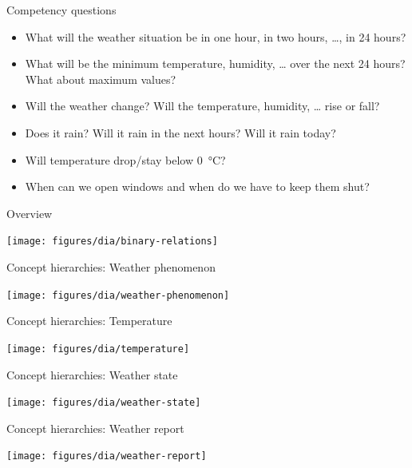 \documentclass{beamer}
\begin{document}
\begin{frame}{Competency questions}
	\begin{itemize}
		\item What will the weather situation be in one hour, in two hours, …, in 24 hours?
		\item What will be the minimum temperature, humidity, … over the next 24 hours? What about maximum values?
		\item Will the weather change? Will the temperature, humidity, … rise or fall?
		\item Does it rain? Will it rain in the next hours? Will it rain today?
		\item Will temperature drop/stay below \SI{0}{\celsius}?
		\item When can we open windows and when do we have to keep them shut?
	\end{itemize}
\end{frame}

\begin{frame}{Overview}
	\begin{center}
		\texttt{[image: figures/dia/binary-relations]}
	\end{center}
\end{frame}

\begin{frame}{Concept hierarchies: Weather phenomenon}
	\begin{center}
		\texttt{[image: figures/dia/weather-phenomenon]}
	\end{center}
\end{frame}

\begin{frame}{Concept hierarchies: Temperature}
	\begin{center}
		\texttt{[image: figures/dia/temperature]}
	\end{center}
\end{frame}

\begin{frame}{Concept hierarchies: Weather state}
	\begin{center}
		\texttt{[image: figures/dia/weather-state]}
	\end{center}
\end{frame}

\begin{frame}{Concept hierarchies: Weather report}
	\begin{center}
		\texttt{[image: figures/dia/weather-report]}
	\end{center}
\end{frame}
\end{document}

